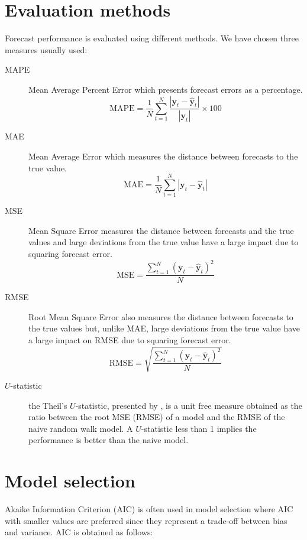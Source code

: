 \newpage

\section{Evaluation methods} \label{sec:evaluation}

Forecast performance is evaluated using different methods. We have chosen three
measures usually used:
\begin{description}
\item[MAPE] Mean Average Percent Error which presents forecast errors as a
percentage.
\begin{equation}\label{eq:MAPE}
\text{MAPE} = \frac{1}{N} \sum_{t=1}^{N} 
\frac{\left|\mathbf{y}_t-\hat{\mathbf{y}}_t\right|}{\left|\mathbf{y}_t\right|}
 \times 100 
\end{equation}
\item[MAE] Mean Average Error which measures the distance between forecasts to the
true value.
\begin{equation}\label{eq:MAE}
\text{MAE} = \frac{1}{N} \sum_{t=1}^{N} 
\left| 
\mathbf{y}_t-\hat{\mathbf{y}}_t
\right| 
\end{equation}
\item[MSE]  Mean Square Error measures the distance between forecasts
and the true values and large deviations from the true value have a
large impact due to squaring forecast error.
\begin{equation}\label{eq:MSE}
\text{MSE} = 
\frac{\displaystyle \sum_{t=1}^{N} (\mathbf{y}_t-\hat{\mathbf{y}}_t)^2}{N}
\end{equation}
\item[RMSE] Root Mean Square Error also measures the distance between forecasts
to the true values but, unlike MAE, large deviations from the true value have a
large impact on RMSE due to squaring forecast error.
\begin{equation}\label{eq:RMSE}
\text{RMSE} = \sqrt{
\frac{\displaystyle \sum_{t=1}^{N} (\mathbf{y}_t-\hat{\mathbf{y}}_t)^2}{N}}
\end{equation}
\item[$U$-statistic] the Theil's $U$-statistic, presented by
\cite{theil1966}, is a unit free measure obtained as the ratio between the root
MSE (RMSE) of a model and the RMSE of the naive random walk model. A
$U$-statistic less than 1 implies the performance is better than the naive
model.
\end{description}


\section{Model selection} \label{sec:pselection}
Akaike Information Criterion (AIC) is often used in model selection where AIC
with smaller values are preferred since they represent a trade-off between bias
and variance.  AIC is obtained as follows:

